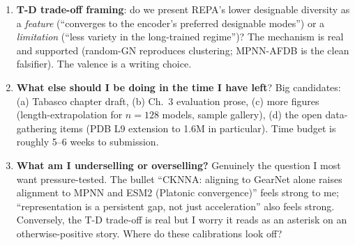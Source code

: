 \documentclass[11pt,a4paper]{article}
\begin{document}
\begin{enumerate}[leftmargin=*,itemsep=2pt]
\item \textbf{T-D trade-off framing}: do we present REPA's lower
designable diversity as a \emph{feature} (``converges to the encoder's
preferred designable modes'') or a \emph{limitation} (``less variety
in the long-trained regime'')? The mechanism is real and supported
(random-GN reproduces clustering; MPNN-AFDB is the clean falsifier).
The valence is a writing choice.

\item \textbf{What else should I be doing in the time I have left}? Big
candidates: (a) Tabasco chapter draft, (b) Ch.~3 evaluation prose,
(c) more figures (length-extrapolation for $n{=}128$ models, sample
gallery), (d) the open data-gathering items (PDB L9 extension to 1.6M
in particular). Time budget is roughly 5--6 weeks to submission.

\item \textbf{What am I underselling or overselling?} Genuinely the
question I most want pressure-tested. The bullet ``CKNNA: aligning to
GearNet alone raises alignment to MPNN and ESM2 (Platonic
convergence)'' feels strong to me; ``representation is a persistent
gap, not just acceleration'' also feels strong. Conversely, the
T-D trade-off is real but I worry it reads as an asterisk on an
otherwise-positive story. Where do these calibrations look off?
\end{enumerate}
\end{document}
